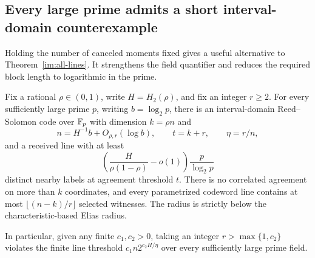 \subsection{Every large prime admits a short interval-domain counterexample}
\label{sec:logarithmic-lines}

Holding the number of canceled moments fixed gives a useful alternative
to Theorem~\ref{im:all-lines}. It strengthens the field quantifier and
reduces the required block length to logarithmic in the prime.

\begin{theorem}
\label{thm:logarithmic-lines}
Fix a rational $\rho\in(0,1)$, write $H=H_2(\rho)$, and fix an
integer $r\ge2$. For every sufficiently large prime $p$, writing
$b=\log_2p$, there is an interval-domain Reed--Solomon code over
$\mathbb F_p$ with dimension $k=\rho n$ and
\[
 n=H^{-1}b+O_{\rho,r}(\log b),\qquad
 t=k+r,\qquad \eta=r/n,
\]
and a received line with at least
\begin{equation}\label{eq:logarithmic-line-count}
 \left(\frac{H}{\rho(1-\rho)}-o(1)\right)\frac{p}{\log_2p}
\end{equation}
distinct nearby labels at agreement threshold $t$.
There is no correlated agreement on more than $k$ coordinates, and
every parametrized codeword line contains at most
$\lfloor(n-k)/r\rfloor$ selected witnesses. The radius is strictly
below the characteristic-based Elias radius.

In particular, given any finite $c_1,c_2>0$, taking an integer
$r>\max\{1,c_2\}$ violates the finite line threshold
$c_1n2^{c_2H/\eta}$ over every sufficiently large prime field.
\end{theorem}
